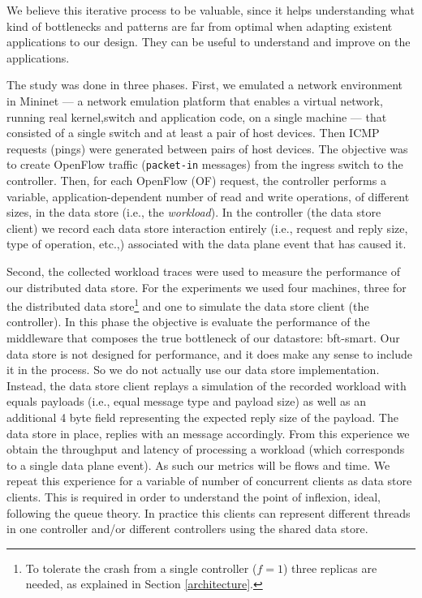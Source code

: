 We believe this iterative process to be valuable, since it helps
understanding what kind of bottlenecks and patterns are far from
optimal when adapting existent applications to our design. They can be
useful to understand and improve on the applications. 


The study was done in three phases.  
First, we emulated a network environment in Mininet  --- a network
emulation platform that enables a virtual network, running real
kernel,switch and application code, on a single machine \cite{Handigol:2012t} ---  that consisted of a single switch and at
least a pair of host devices. Then ICMP requests (pings) were
generated between pairs of host devices. The objective was to create OpenFlow  traffic (\texttt{packet-in} messages) from the ingress switch to the controller.
Then, for each OpenFlow (OF) request, the controller performs a
variable, application-dependent number of read and write operations,
of different sizes, in the data store (i.e., the
\textit{workload}). In the controller  (the data store client) we
record each data store interaction entirely (i.e., request and reply
size, type of operation, etc.,)  associated with the data plane event
that has caused it. 

Second, the collected workload traces were used to measure the performance of our distributed data store.
For the experiments we used four machines, three for the distributed
data store\footnote{To tolerate the crash from a single controller
  ($f=1$) three replicas are needed, as explained in Section
  \ref{architecture}.} and one to simulate the data store client (the
controller).  In this phase the objective is evaluate the performance
of the middleware that composes the true bottleneck of our datastore:
bft-smart. Our data store is not designed for performance, and it does
make any sense to include it in the process. So we do not actually use our data store
implementation. Instead, the data store client  replays a simulation of the recorded
workload with equals payloads (i.e., equal message type and payload
size) as well as an additional 4 byte field representing the expected
reply size of the payload. The data store in place, replies with an
message accordingly. From this experience we obtain the throughput and
latency of processing a workload (which corresponds to a single data
plane event). As such our metrics will be flows and time.  We repeat
this experience for a variable of number of concurrent clients as data
store clients. This is required in order to understand the point of
inflexion, ideal, following the queue theory. In practice this clients
can represent different threads in one controller and/or different
controllers using the shared data store. 


